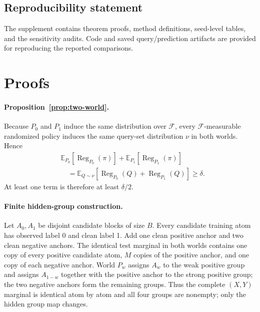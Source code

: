 \documentclass{article}
\begin{document}
\subsection*{Reproducibility statement}
\label{maintext:end}
The supplement contains theorem proofs, method definitions, seed-level tables, and the sensitivity audits. Code and saved query/prediction artifacts are provided for reproducing the reported comparisons.\label{maintext:veryend}

{\small
\label{refs:start}


}

\clearpage
\appendix

\section{Proofs}
\label{app:proofs}

\paragraph{Proposition~\ref{prop:two-world}.}
Because $P_0$ and $P_1$ induce the same distribution over $\mathcal F$, every $\mathcal F$-measurable randomized policy induces the same query-set distribution $\nu$ in both worlds. Hence
\begin{align}
&\mathbb E_{P_0}[\operatorname{Reg}_{P_0}(\pi)]
+\mathbb E_{P_1}[\operatorname{Reg}_{P_1}(\pi)]\\
&\quad=\mathbb E_{Q\sim\nu}\!
\left[\operatorname{Reg}_{P_0}(Q)+\operatorname{Reg}_{P_1}(Q)\right]\geq\delta.
\end{align}
At least one term is therefore at least $\delta/2$.

\paragraph{Finite hidden-group construction.}
Let $A_0,A_1$ be disjoint candidate blocks of size $B$. Every candidate training atom has observed label 0 and clean label 1. Add one clean positive anchor and two clean negative anchors. The identical test marginal in both worlds contains one copy of every positive candidate atom, $M$ copies of the positive anchor, and one copy of each negative anchor. World $P_w$ assigns $A_w$ to the weak positive group and assigns $A_{1-w}$ together with the positive anchor to the strong positive group; the two negative anchors form the remaining groups. Thus the complete $(X,Y)$ marginal is identical atom by atom and all four groups are nonempty; only the hidden group map changes.
\end{document}
